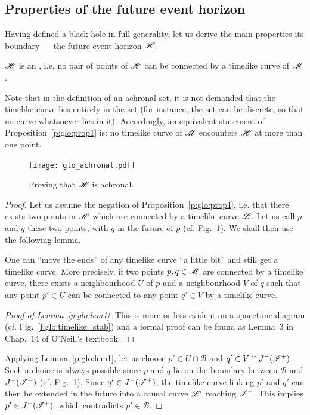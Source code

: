\subsection{Properties of the future event horizon} \label{s:glo:properties_H}

Having defined a black hole in full generality, let us derive the
main properties its boundary --- the future event horizon $\mathscr{H}$.

\begin{prop}
\label{p:glo:prop1}
$\mathscr{H}$ is an , i.e. no pair of points of $\mathscr{H}$ can be connected
by a timelike curve of $\mathscr{M}$.
\end{prop}

Note that in the definition of an achronal set, it is not demanded that the timelike
curve lies entirely in the set (for instance, the set can be discrete, so that no curve
whatsoever lies in it). Accordingly,
an equivalent statement of Proposition~\ref{p:glo:prop1} is: no timelike curve of $\mathscr{M}$
encounters $\mathscr{H}$ at more than one point.

\begin{figure}
\centerline{\texttt{[image: glo\_achronal.pdf]}}
\caption[]{\label{f:glo:achronal} \footnotesize
Proving that $\mathscr{H}$ is achronal.}
\end{figure}

\begin{proof}
Let us assume the negation of Proposition~\ref{p:glo:prop1}, i.e. that there exists two points
in $\mathscr{H}$ which are connected by a timelike curve $\mathscr{L}$. Let us call $p$ and
$q$ these two points, with $q$ in the future of $p$ (cf. Fig.~\ref{f:glo:achronal}).
We shall then use the following lemma.
\begin{lemma}
\label{p:glo:lem1}
One can ``move the ends'' of any timelike curve
``a little bit'' and still get a timelike curve. More precisely,
if two points $p,q\in\mathscr{M}$ are connected by a timelike curve,
there exists
a neighbourhood $U$ of $p$ and a neighbourhood $V$ of $q$ such that
any point $p'\in U$ can be connected to any point $q'\in V$ by a timelike curve.
\end{lemma}
\begin{proof}[Proof of Lemma~\ref{p:glo:lem1}]
This is more or less evident on a spacetime diagram (cf. Fig.~\ref{f:glo:timelike_stab})
and a formal proof
can be found as Lemma~3
in Chap.~14 of O'Neill's textbook \cite{ONeil83}.
\end{proof}
Applying Lemma~\ref{p:glo:lem1},
let us choose $p'\in U\cap\mathscr{B}$ and $q'\in V\cap J^-(\mathscr{I}^+)$. Such a choice is
always possible since $p$ and $q$ lie on the boundary between $\mathscr{B}$
and $J^-(\mathscr{I}^+)$ (cf. Fig.~\ref{f:glo:achronal}).
Since $q'\in J^-(\mathscr{I}^+)$, the timelike curve linking $p'$ and $q'$ can then be extended in the future into a causal curve $\mathscr{L}'$ reaching $\mathscr{I}^+$. This implies $p'\in J^-(\mathscr{I}^+)$,
which contradicts $p'\in\mathscr{B}$.
\end{proof}

